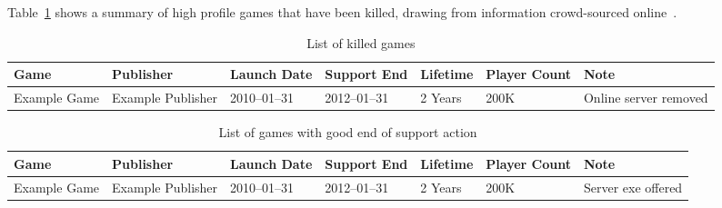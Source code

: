 
Table~\ref{tab:killedgames} shows a summary of high profile games that have been killed, drawing from information crowd-sourced online~\cite{dead-games-list-2016}.

\begin{landscape}
\begin{table}[htbp]
    \centering
    \caption{List of killed games}%
    \label{tab:killedgames}
    \begin{tabular*}{1\textwidth}{lllllll}
        Game & Publisher & Launch Date & Support End & Lifetime & Player Count & Note \\ \toprule
        Example Game & Example Publisher & 2010--01--31 & 2012--01--31 & 2 Years & 200K & Online server removed \\
    \end{tabular*}
\end{table}
\end{landscape}

\begin{landscape}
    \begin{table}[htbp]
        \centering
        \caption{List of games with good end of support action}%
        \label{tab:savedgames}
        \begin{tabular*}{1\textwidth}{lllllll}
            Game & Publisher & Launch Date & Support End & Lifetime & Player Count & Note \\ \toprule
            Example Game & Example Publisher & 2010--01--31 & 2012--01--31 & 2 Years & 200K & Server exe offered \\
        \end{tabular*}
    \end{table}
\end{landscape}
